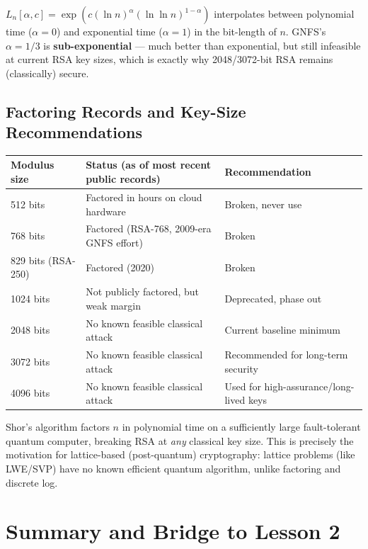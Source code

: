 \begin{remark}[$L$-notation]
$L_n[\alpha, c] = \exp\left(c (\ln n)^\alpha (\ln \ln n)^{1-\alpha}\right)$ interpolates between polynomial time ($\alpha = 0$) and exponential time ($\alpha = 1$) in the bit-length of $n$. GNFS's $\alpha = 1/3$ is \textbf{sub-exponential} — much better than exponential, but still infeasible at current RSA key sizes, which is exactly why 2048/3072-bit RSA remains (classically) secure.
\end{remark}

\subsection{Factoring Records and Key-Size Recommendations}

\begin{center}
\begin{tabular}{lll}
\toprule
\textbf{Modulus size} & \textbf{Status (as of most recent public records)} & \textbf{Recommendation} \\
\midrule
512 bits & Factored in hours on cloud hardware & Broken, never use \\
768 bits & Factored (RSA-768, 2009-era GNFS effort) & Broken \\
829 bits (RSA-250) & Factored (2020) & Broken \\
1024 bits & Not publicly factored, but weak margin & Deprecated, phase out \\
2048 bits & No known feasible classical attack & Current baseline minimum \\
3072 bits & No known feasible classical attack & Recommended for long-term security \\
4096 bits & No known feasible classical attack & Used for high-assurance/long-lived keys \\
\bottomrule
\end{tabular}
\end{center}

\begin{remark}
Shor's algorithm factors $n$ in polynomial time on a sufficiently large fault-tolerant quantum computer, breaking RSA at \emph{any} classical key size. This is precisely the motivation for lattice-based (post-quantum) cryptography: lattice problems (like LWE/SVP) have no known efficient quantum algorithm, unlike factoring and discrete log.
\end{remark}

\newpage
\section{Summary and Bridge to Lesson 2}

